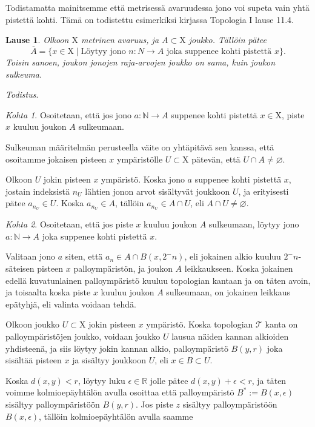 \documentclass[12pt,a4paper,leqno]{report}
\newcommand{\R}{\mathbb{R}}
\newcommand{\N}{\mathbb{N}}
\newcommand{\X}{\mathrm{X}}
\newcommand{\T}{\mathcal{T}}
\theoremstyle{plain}
\newtheorem{lause}[equation]{Lause}
\theoremstyle{definition}
\theoremstyle{remark}
\begin{document}
Todistamatta mainitsemme että metrisessä avaruudessa jono voi supeta vain yhtä pistettä kohti. Tämä on todistettu esimerkiksi kirjassa Topologia I \cite{Topo1} lause 11.4.

\begin{lause}
Olkoon $\X$ metrinen avaruus, ja $A \subset \X$ joukko. Tällöin pätee
\begin{equation}
\overline{A} = \{x \in \X \mid \text{Löytyy jono } n : N \to A \text{ joka suppenee kohti pistettä } x\}\text{.}
\end{equation}
Toisin sanoen, joukon jonojen raja-arvojen joukko on sama, kuin joukon sulkeuma.
\end{lause}

\noindent\emph{Todistus}.

\emph{Kohta 1}. Osoitetaan, että jos jono $a : \N \to A$ suppenee kohti pistettä $x \in \X$, piste $x$ kuuluu joukon $A$ sulkeumaan.

Sulkeuman määritelmän perusteella väite on yhtäpitävä sen kanssa, että osoitamme jokaisen pisteen $x$ ympäristölle $U \subset \X$ pätevän, että $U \cap A \not= \varnothing$.

Olkoon $U$ jokin pisteen $x$ ympäristö. Koska jono $a$ suppenee kohti pistettä $x$, jostain indeksistä $n_U$ lähtien jonon arvot sisältyvät joukkoon $U$, ja erityisesti pätee $a_{n_U} \in U$. Koska $a_{n_U} \in A$, tällöin $a_{n_U} \in A \cap U$, eli $A \cap U \not= \varnothing$.

\emph{Kohta 2}. Osoitetaan, että jos piste $x$ kuuluu joukon $A$ sulkeumaan, löytyy jono $a : \N \to A$ joka suppenee kohti pistettä $x$.

Valitaan jono $a$ siten, että $a_n \in A \cap B(x, 2^-n)$, eli jokainen alkio kuuluu $2^-n$-säteisen pisteen $x$ palloympäristön, ja joukon $A$ leikkaukseen. Koska jokainen edellä kuvatunlainen palloympäristö kuuluu topologian kantaan ja on täten avoin, ja toisaalta koska piste $x$ kuuluu joukon $A$ sulkeumaan, on jokainen leikkaus epätyhjä, eli valinta voidaan tehdä.

Olkoon joukko $U \subset \X$ jokin pisteen $x$ ympäristö. Koska topologian $\T$ kanta on palloympäristöjen joukko, voidaan joukko $U$ lausua näiden kannan alkioiden yhdisteenä, ja siis löytyy jokin kannan alkio, palloympäristö $B(y,r)$ joka sisältää pisteen $x$ ja sisältyy joukkoon $U$, eli $x \in B \subset U$.

Koska $d(x,y) < r$, löytyy luku $\epsilon \in \R$ jolle pätee $d(x,y) + \epsilon < r$, ja täten voimme kolmioepäyhtälön avulla osoittaa että palloympäristö $B^* := B(x,\epsilon)$ sisältyy palloympäristöön $B(y,r)$. Jos piste $z$ sisältyy palloympäristöön $B(x,\epsilon)$, tällöin kolmioepäyhtälön avulla saamme
\end{document}
